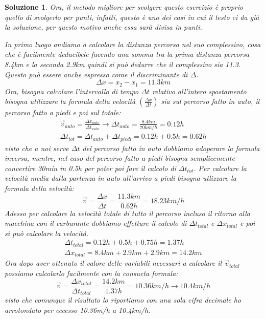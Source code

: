 \documentclass{article}
\newtheorem{sol}{Soluzione}[section]
\begin{document}
\begin{sol}
  Ora, il metodo migliore per svolgere questo esercizio è proprio quello di svolgerlo per punti, infatti, questo è uno dei casi in cui il testo ci da già la soluzione, per questo motivo anche essa sarà divisa in punti.
  \begin{tasks}
    \task In primo luogo andiamo a calcolare la distanza percorsa nel suo complessivo, cosa che è facilmente deducibele facendo una somma tra la prima distanza percorsa 8.4km e la seconda 2.9km quindi si può dedurre che il complessivo sia 11.3. Questo può essere anche espresso come il discriminante di $\Delta{}$.
    \begin{equation*}
      \Delta{}x=x_2-x_1=11.3km
    \end{equation*}
    \task Ora, bisogna calcolare l'intervallo di tempo $\Delta{}t$ relativo all'intero spostamento bisogna utilizzare la formula della velocità $\left(\frac{\Delta{}x}{\Delta{}t}\right)$ sia sul percorso fatto in auto, il percorso fatto a piedi e poi sul totale:
    \begin{eqnarray*}
      \vec{v}_{auto}=\frac{\Delta{}x_{auto}}{\Delta{}t_{auto}}\to \Delta{}t_{auto}=\frac{8.4km}{70km/h}=0.12h\\
      \Delta{}t_{tot}=\Delta{}t_{auto}+\Delta{}t_{piedi}=0.12h+0.5h=0.62h
    \end{eqnarray*}
    visto che a noi serve $\Delta{}t$ del percorso fatto in auto dobbiamo adoperare la formula inversa, mentre, nel caso del percorso fatto a piedi bisogna semplicemente convertire 30min in 0.5h per poter poi fare il calcolo di $\Delta{}t_{tot}$. 
    \task Per calcolare la velocità media dalla partenza in auto all'arrivo a piedi bisogna utlizzare la formula della velocità:
    \begin{equation*}
      \vec{v}=\frac{\Delta{}x}{\Delta{}t} = \frac{11.3km}{0.62h}=18.23km/h
    \end{equation*}
    \task Adesso per calcolare la velocità totale di tutto il percorso incluso il ritorno alla macchina con il carburante dobbiamo effetture il calcolo di $\Delta{}t_{total}$ e $\Delta{}x_{total}$ e poi si può calcolare la velocità.
    \begin{eqnarray*}
      \Delta{}t_{total} = 0.12h + 0.5h + 0.75h = 1.37h\\
      \Delta{}x_{total} = 8.4km + 2.9km + 2.9km =14.2km 
    \end{eqnarray*}
    Ora dopo aver ottenuto il valore delle variabili necessari a calcolare il $\vec{v}_{total}$ possiamo calcolarlo facilmente con la consueta formula:
    \begin{equation*}
      \vec{v}=\frac{\Delta{}x_{total}}{\Delta{}t_{total}} = \frac{14.2km}{1.37h}=10.36km/h \to 10.4km/h
    \end{equation*}
    visto che comunque il risultato lo riportiamo con una sola cifra decimale ho arrotondato per eccesso 10.36m/h a 10.4km/h.
  \end{tasks}
\end{sol}
\end{document}
